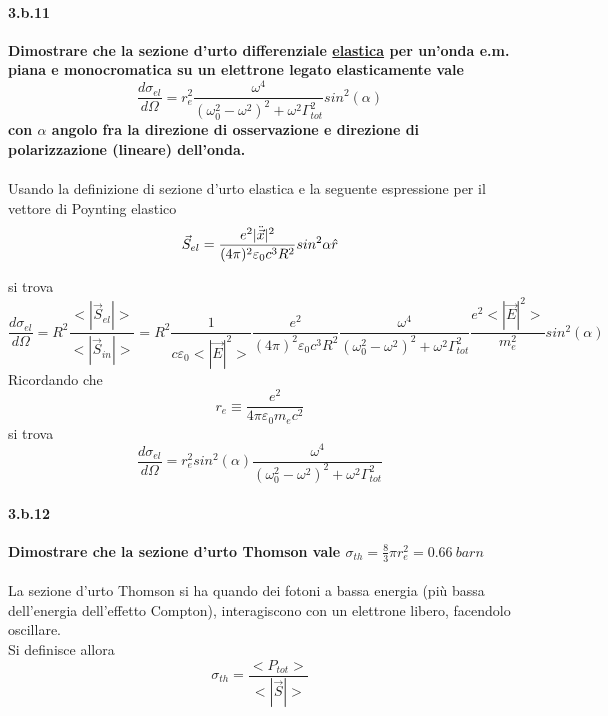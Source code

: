 \documentclass[twoside]{article}
\begin{document}
\paragraph{3.b.11}\textbf{Dimostrare che la sezione d’urto differenziale \underline{elastica} per un’onda e.m. piana e
monocromatica su un elettrone legato elasticamente vale 
\begin{equation*}
    \frac{d\sigma_{el}}{d\Omega}=r_e ^2 \frac{\omega^4}{(\omega_0 ^2 -\omega^2)^2+\omega^2 \Gamma_{tot}^2}sin^2(\alpha)
\end{equation*}
con $\alpha$ angolo fra la direzione di osservazione e direzione di polarizzazione
(lineare) dell'onda.}\\ \\
Usando la definizione di sezione d'urto elastica e la seguente espressione per il vettore di Poynting elastico
\begin{equation}
    \vec{S}_{el}=\frac{e^2 |\Ddot{\vec{x}}|^2}{(4\pi)^2\varepsilon_0 c^3 R^2}sin^2\alpha \hat{r}
\end{equation}

si trova
\begin{equation}
    \frac{d\sigma_{el}}{d\Omega}=R^2\frac{<|\vec{S}_{el}|>}{<|\vec{S}_{in}|>}=R^2 \frac{1}{c \varepsilon_0 <|\vec{E}|^2>}\frac{e^2}{(4 \pi)^2 \varepsilon_0 c^3 R^2}\frac{\omega^4}{(\omega_0 ^2 -\omega^2)^2+\omega^2 \Gamma_{tot}^2}\frac{e^2 <|\vec{E}|^2>}{m_e ^2}sin^2 (\alpha)
\end{equation}
Ricordando che 
\begin{equation}
    r_e\equiv \frac{e^2}{4\pi \varepsilon_0 m_e c^2}
\end{equation}
si trova
\begin{equation}
     \frac{d\sigma_{el}}{d\Omega}=r_e^2 sin^2(\alpha) \frac{\omega^4}{(\omega_0^2-\omega^2)^2+\omega^2 \Gamma_{tot}^2}
\end{equation}




\paragraph{3.b.12}\textbf{Dimostrare che la sezione d’urto Thomson vale $\sigma_{th}=\frac{8}{3}\pi r_e ^2=0.66 \ barn$}\\ \\
La sezione d'urto Thomson si ha quando dei fotoni a bassa energia (più bassa dell'energia dell'effetto Compton), interagiscono con un elettrone libero, facendolo oscillare.
\\
Si definisce allora
\begin{equation}
    \sigma_{th}=\frac{<P_{tot}>}{<|\vec{S}|>}
\end{equation}
\end{document}
